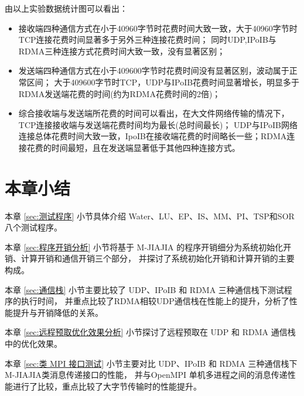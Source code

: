 {    由以上实验数据统计图可以看出：
    \begin{itemize}
        \item 接收端四种通信方式在小于40960字节时花费时间大致一致，大于40960字节时TCP连接花费时间显著多于另外三种连接花费时间；
              同时UDP,IPoIB与RDMA三种连接方式花费时间大致一致，没有显著区别；
        \item 发送端四种通信方式在小于409600字节时花费时间没有显著区别，波动属于正常区间；
              大于409600字节时TCP，UDP与IPoIB花费时间显著增长，明显多于RDMA发送端花费的时间(约为RDMA花费时间的2倍)；
        \item 综合接收端与发送端所花费的时间可以看出，在大文件网络传输的情况下，TCP连接接收端与发送端花费时间均为最长(总时间最长)；
              UDP与IPoIB网络连接总体花费时间大致一致，IpoIB在接收端花费的时间略长一些；RDMA连接花费的时间最短，且在发送端显著低于其他四种连接方式。
    \end{itemize}

    \section{本章小结}
    本章 \ref{sec:测试程序} 小节具体介绍 Water、LU、EP、IS、MM、PI、TSP和SOR 八个测试程序。

    本章 \ref{sec:程序开销分析} 小节将基于 M-JIAJIA 的程序开销细分为系统初始化开销、计算开销和通信开销三个部分，
    并探讨了系统初始化开销和计算开销的主要构成。

    本章 \ref{sec:通信栈} 小节主要比较了 UDP、IPoIB 和 RDMA 三种通信栈下测试程序的执行时间，
    并重点比较了RDMA相较UDP通信栈在性能上的提升，分析了性能提升与开销降低的关系。

    本章 \ref{sec:远程预取优化效果分析} 小节探讨了远程预取在 UDP 和 RDMA 通信栈中的优化效果。

    本章 \ref{sec:类 MPI 接口测试} 小节主要对比 UDP、IPoIB 和 RDMA 三种通信栈下M-JIAJIA类消息传递接口的性能，
    并与OpenMPI 单机多进程之间的消息传递性能进行了比较，重点比较了大字节传输时的性能提升。
}